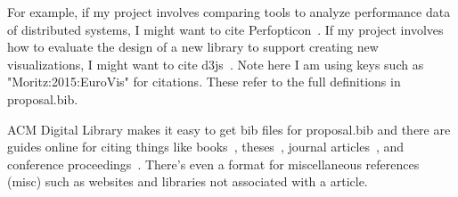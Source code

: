 For example, if my project involves comparing tools to analyze performance
data of distributed systems, I might want to cite
Perfopticon~\cite{Moritz:2015:EuroVis}. If my project involves how to evaluate
the design of a new library to support creating new visualizations, I might
want to cite d3js~\cite{d3js}. Note here I am using keys such as
"Moritz:2015:EuroVis" for citations. These refer to the full definitions in
proposal.bib.

ACM Digital Library makes it easy to get bib files for proposal.bib and there
are guides online for citing things like books~\cite{ware:2004:IVP},
theses~\cite{levoy:1989:DSV}, journal articles~\cite{Lorensen:1987:MCA}, and
conference proceedings~\cite{Nielson:1991:TAD}. There's even a format for
miscellaneous references (misc) such as websites and libraries not associated
with a article.

